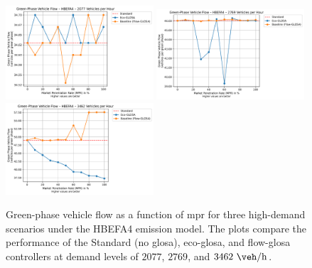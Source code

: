 \begin{figure}[htb]
  \centering
  \includegraphics[width=0.49\textwidth]{data/img/GreenPhaseVehicleFlow/GreenPhaseVehicleFlow_HBEFA4_Cars1500.pdf}
  \includegraphics[width=0.49\textwidth]{data/img/GreenPhaseVehicleFlow/GreenPhaseVehicleFlow_HBEFA4_Cars2000.pdf}
  \includegraphics[width=0.49\textwidth]{data/img/GreenPhaseVehicleFlow/GreenPhaseVehicleFlow_HBEFA4_Cars2500.pdf}
  \caption[Green-phase vehicle flow vs. \ac{mpr} at $2077$, $2769$, and $3462~\unit{\veh\per\hour}$ (HBEFA4)]{Green-phase vehicle flow as a function of \ac{mpr} for three high-demand scenarios under the HBEFA4 emission model. The plots compare the performance of the Standard (no \ac{glosa}), \ac{eco-glosa}, and \ac{flow-glosa} controllers at demand levels of $2077$, $2769$, and $3462~\unit{\veh\per\hour}$.}
\label{fig:HBEFA4_Flow}
\end{figure}

